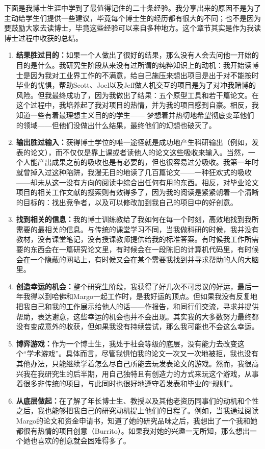 \documentclass[letter,12pt]{book}
\begin{document}
\begin{CJK}{UTF8}{gbsn}
下面是我博士生涯中学到了最值得记住的二十条经验。我分享出来的原因不是为了主动给学生们提供一些建议，毕竟每个博士生的经历都有很大的不同；也不是因为要鼓励大家去读博士，毕竟这些经验可以来自多种地方。这个章节其实是作为我读博士过程中收获的总结。
\begin{enumerate}
  \item \textbf{结果胜过目的：}如果一个人做出了很好的结果，那么没有人会去问他一开始的目的是什么。我研究生阶段从来没有过所谓的纯粹知识上的动机：我开始读博士是因为我对工业界工作的不满意，给自己施压来想出项目是出于对不能按时毕业的忧惧，帮助Scott、Joel以及Jeff做人机交互的项目是为了对冲我赌博的风险。但我最终成功了，因为我做出了结果：五个原型工具和若干篇论文。在这个过程中，我培养起了我对项目的热情，并为我的项目感到自豪。相反，我知道一些有着最理想主义目的的学生—— 梦想着并热切地希望彻底变革他们的领域——但他们没做出什么结果，最终他们的幻想也破灭了。
  \item \textbf{输出胜过输入：}获得博士学位的唯一途径就是成功地产生科研输出（例如，发表的论文），而不仅仅是靠上课或者读他人的论文这些吸收来输入。当然，一个人能产出成果之前的吸收也是有必要的，但也很容易过分吸收。我第一年时就曾掉入过这种陷阱，我漫无目的地读了几百篇论文——一种狂欢式的吸收——却未从这一没有方向的阅读中综合出任何有用的东西。相反，对毕业论文项目的相关工作文献的搜索则有效得多了，因为我的阅读是紧紧朝着一个清晰的目标的：找出竞争者，以及可以修改加到我自己的项目中的好创意。
  \item \textbf{找到相关的信息：}我的博士训练教给了我如何在每一个时刻，高效地找到我所需要的最相关的信息。与传统的课堂学习不同，当我做科研的时候，我并没有教材，没有课堂笔记，没有授课教师提供给我的标准答案。有时候我工作所需要的东西会在一篇研究论文里，有时候会在一段陈旧的计算机代码里，有时候会在一个隐蔽的网站上，有时候又会在某个需要我找到并寻求帮助的人的大脑里。
  \item \textbf{创造幸运的机会：}整个研究生阶段，我获得了好几次不可思议的好运，最后一年我得以到哈佛和Margo一起工作时，是我好运的顶点。但如果我没有反复地把我自己和我的工作展示给他人的话——作报告，和同行们交流，寻求并提供帮助，表达谢意，这些幸运的机会也并不会出现。其实我的大多数努力最终都没有变成意外的收获，但如果我没有持续尝试，那么我可能也不会这么幸运。
  \item \textbf{博弈游戏：}作为一个博士生，我处于社会等级的底层，没有能力去改变这个“学术游戏”。具体而言，尽管我惧怕我的论文一次又一次地被拒，我也没有其他办法，只能继续学着怎么尽自己所能去玩发表论文的游戏。然而，我很高兴我在我研究生的后半期，用自己独特且有创造力的方式来玩这个游戏，从事着很多非传统的项目，与此同时也很好地遵守着发表和毕业的“规则”。
  \item \textbf{从底层做起：}在了解了年长博士生、教授以及其他老资历同事们的动机和个性之后，我也能够把我自己的研究动机提上他们的日程了。例如，当我通过阅读Margo的论文和资金申请书，知道了她的研究品味之后，我想出了一个我和她都很有热情的项目创意（Burrito）。如果我对她的兴趣一无所知，那么想出一个她也喜欢的创意就会困难得多了。

\end{enumerate}
\end{CJK}
\end{document}
